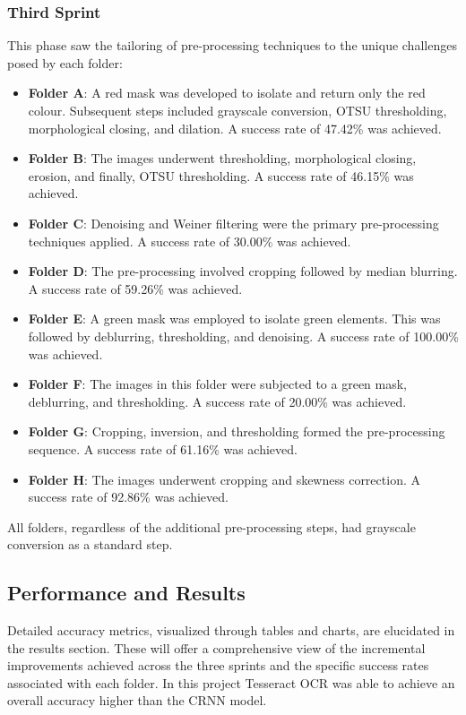 \subsubsection{Third Sprint}
This phase saw the tailoring of pre-processing techniques to the unique challenges posed by each folder:
\begin{itemize}
    \item \textbf{Folder A}: A red mask was developed to isolate and return only the red colour. Subsequent steps included grayscale conversion, OTSU thresholding, morphological closing, and dilation. A success rate of 47.42\% was achieved.
    \item \textbf{Folder B}: The images underwent thresholding, morphological closing, erosion, and finally, OTSU thresholding. A success rate of 46.15\% was achieved.
    \item \textbf{Folder C}: Denoising and Weiner filtering were the primary pre-processing techniques applied. A success rate of 30.00\% was achieved.
    \item \textbf{Folder D}: The pre-processing involved cropping followed by median blurring. A success rate of 59.26\% was achieved.
    \item \textbf{Folder E}: A green mask was employed to isolate green elements. This was followed by deblurring, thresholding, and denoising. A success rate of 100.00\% was achieved.
    \item \textbf{Folder F}: The images in this folder were subjected to a green mask, deblurring, and thresholding. A success rate of 20.00\% was achieved.
    \item \textbf{Folder G}: Cropping, inversion, and thresholding formed the pre-processing sequence. A success rate of 61.16\% was achieved.
    \item \textbf{Folder H}: The images underwent cropping and skewness correction. A success rate of 92.86\% was achieved.
\end{itemize}
All folders, regardless of the additional pre-processing steps, had grayscale conversion as a standard step.

\subsection{Performance and Results}
Detailed accuracy metrics, visualized through tables and charts, are elucidated in the results section. These will offer a comprehensive view of the incremental improvements achieved across the three sprints and the specific success rates associated with each folder. In this project Tesseract OCR was able to achieve an overall accuracy higher than the CRNN model.


